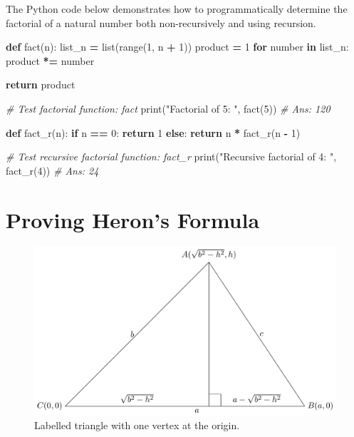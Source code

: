 \documentclass[
]{book}
\newenvironment{Shaded}{\begin{snugshade}}{\end{snugshade}}
\newcommand{\BuiltInTok}[1]{#1}
\newcommand{\CommentTok}[1]{\textcolor[rgb]{0.56,0.35,0.01}{\textit{#1}}}
\newcommand{\ControlFlowTok}[1]{\textcolor[rgb]{0.13,0.29,0.53}{\textbf{#1}}}
\newcommand{\DecValTok}[1]{\textcolor[rgb]{0.00,0.00,0.81}{#1}}
\newcommand{\KeywordTok}[1]{\textcolor[rgb]{0.13,0.29,0.53}{\textbf{#1}}}
\newcommand{\NormalTok}[1]{#1}
\newcommand{\OperatorTok}[1]{\textcolor[rgb]{0.81,0.36,0.00}{\textbf{#1}}}
\newcommand{\StringTok}[1]{\textcolor[rgb]{0.31,0.60,0.02}{#1}}
\begin{document}
The Python code below demonstrates how to programmatically determine the factorial of a natural number both non-recursively and using recursion.

\begin{Shaded}
\begin{Highlighting}[]
\KeywordTok{def}\NormalTok{ fact(n):}
\NormalTok{    list\_n }\OperatorTok{=} \BuiltInTok{list}\NormalTok{(}\BuiltInTok{range}\NormalTok{(}\DecValTok{1}\NormalTok{, n }\OperatorTok{+} \DecValTok{1}\NormalTok{))}
\NormalTok{    product }\OperatorTok{=} \DecValTok{1}
    \ControlFlowTok{for}\NormalTok{ number }\KeywordTok{in}\NormalTok{ list\_n:}
\NormalTok{        product }\OperatorTok{*=}\NormalTok{ number}

    \ControlFlowTok{return}\NormalTok{ product}

\CommentTok{\# Test factorial function: fact}
\BuiltInTok{print}\NormalTok{(}\StringTok{"Factorial of 5: "}\NormalTok{, fact(}\DecValTok{5}\NormalTok{))  }\CommentTok{\# Ans: 120}

\KeywordTok{def}\NormalTok{ fact\_r(n):}
    \ControlFlowTok{if}\NormalTok{ n }\OperatorTok{==} \DecValTok{0}\NormalTok{:}
        \ControlFlowTok{return} \DecValTok{1}
    \ControlFlowTok{else}\NormalTok{:}
        \ControlFlowTok{return}\NormalTok{ n }\OperatorTok{*}\NormalTok{ fact\_r(n }\OperatorTok{{-}} \DecValTok{1}\NormalTok{)}

\CommentTok{\# Test recursive factorial function: fact\_r}
\BuiltInTok{print}\NormalTok{(}\StringTok{"Recursive factorial of 4: "}\NormalTok{, fact\_r(}\DecValTok{4}\NormalTok{))  }\CommentTok{\# Ans: 24}
\end{Highlighting}
\end{Shaded}

\chapter{Proving Heron's Formula}\label{proving-herons-formula}

\begin{figure}
\centering
\includegraphics[width=1\linewidth,height=\textheight,keepaspectratio]{./figure/triangle.png}
\caption{Labelled triangle with one vertex at the origin.}
\end{figure}
\end{document}
